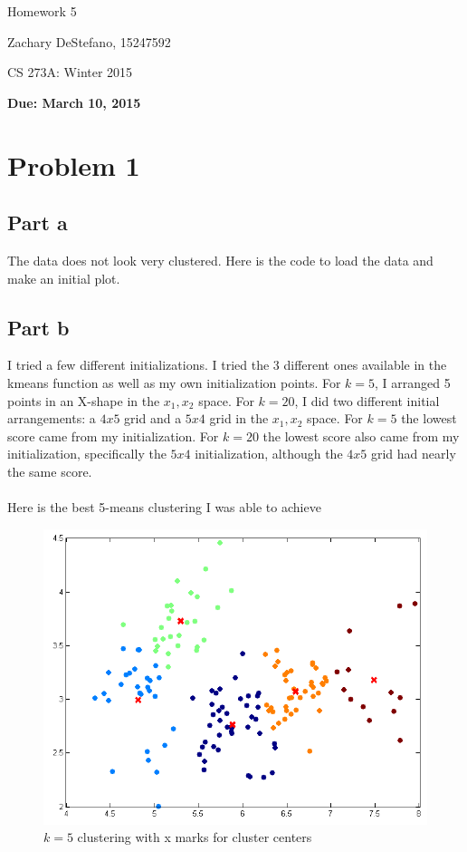\documentclass[twoside,11pt]{article}
\theoremstyle{definition}
\begin{document}
\centerline{\Large Homework 5}
\centerline{Zachary DeStefano, 15247592}
\centerline{CS 273A: Winter 2015}
\centerline{\bf Due: March 10, 2015}

\section*{Problem 1}

\subsection*{Part a}

The data does not look very clustered. Here is the code to load the data and make an initial plot. 


\newpage

\subsection*{Part b}

I tried a few different initializations. I tried the 3 different ones available in the kmeans function as well as my own initialization points. For $k=5$, I arranged 5 points in an X-shape in the $x_1,x_2$ space. For $k=20$, I did two different initial arrangements: a $4x5$ grid and a $5x4$ grid in the $x_1,x_2$ space. For $k=5$ the lowest score came from my initialization. For $k=20$ the lowest score also came from my initialization, specifically the $5x4$ initialization, although the $4x5$ grid had nearly the same score. \\
\\
Here is the best 5-means clustering I was able to achieve
\begin{figure}[h]
\centering
\includegraphics[width=6 in]{prob1PartB_1.png}
\caption{$k=5$ clustering with x marks for cluster centers}
\end{figure}
\end{document}
